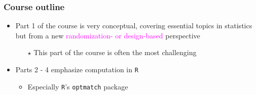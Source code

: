 \documentclass[table, xcolor = {dvipsnames}, 9pt]{beamer}
\theoremstyle{plain}
\begin{document}
\begin{frame}[t]
\frametitle{Course outline}
\vfill
\begin{itemize} \vfill
\item Part 1 of the course is very conceptual, covering essential topics in statistics but from a new \textcolor{magenta}{randomization- or design-based} perspective \vfill
\begin{itemize} \vfill
\item[$\star$] This part of the course is often the most challenging \vfill
\end{itemize} \vfill
\item Parts 2 - 4 emphasize computation in \texttt{R} \vfill
\begin{itemize} \vfill
\item Especially \texttt{R}'s \texttt{optmatch} package \vfill
\end{itemize} \vfill
\end{itemize} \vfill
\vfill
\end{frame}
\end{document}
